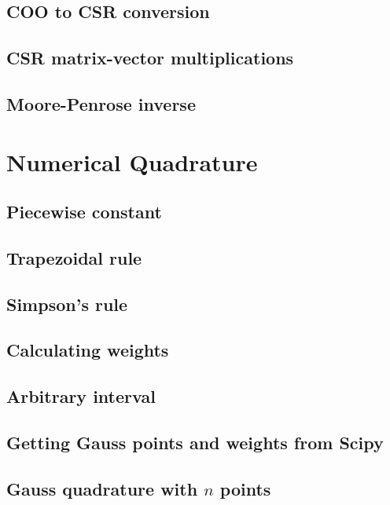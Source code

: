 \documentclass{article}
\begin{document}
\subsection{COO to CSR conversion}


\subsection{CSR matrix-vector multiplications}


\subsection{Moore-Penrose inverse}




\section{Numerical Quadrature}


\subsection{Piecewise constant}


\subsection{Trapezoidal rule}


\subsection{Simpson's rule}


\subsection{Calculating weights}


\subsection{Arbitrary interval}


\subsection{Getting Gauss points and weights from Scipy}


\subsection{Gauss quadrature with $n$ points}
\end{document}
